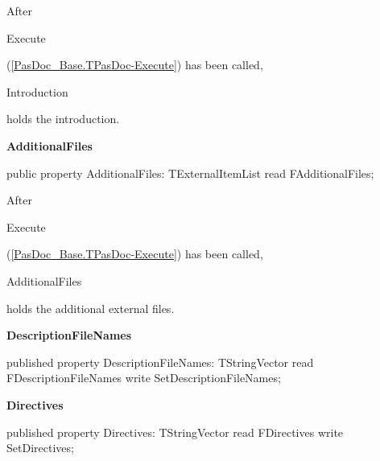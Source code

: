 \documentclass{report}
\newif\ifpdf
\begin{document}
\begin{list}{}
\begin{flushleft}
\ifpdf
\end{flushleft}
\fi


\par After \begin{ttfamily}Execute\end{ttfamily}(\ref{PasDoc_Base.TPasDoc-Execute}) has been called, \begin{ttfamily}Introduction\end{ttfamily} holds the introduction.\label{PasDoc_Base.TPasDoc-AdditionalFiles}
\item[\textbf{AdditionalFiles}\hfill]
\ifpdf
\begin{flushleft}
\fi
\begin{ttfamily}
public property AdditionalFiles: TExternalItemList read FAdditionalFiles;\end{ttfamily}

\ifpdf
\end{flushleft}
\fi


\par After \begin{ttfamily}Execute\end{ttfamily}(\ref{PasDoc_Base.TPasDoc-Execute}) has been called, \begin{ttfamily}AdditionalFiles\end{ttfamily} holds the additional external files.\label{PasDoc_Base.TPasDoc-DescriptionFileNames}
\item[\textbf{DescriptionFileNames}\hfill]
\ifpdf
\begin{flushleft}
\fi
\begin{ttfamily}
published property DescriptionFileNames: TStringVector
      read FDescriptionFileNames write SetDescriptionFileNames;\end{ttfamily}

\ifpdf
\end{flushleft}
\fi


\par  \label{PasDoc_Base.TPasDoc-Directives}
\item[\textbf{Directives}\hfill]
\ifpdf
\begin{flushleft}
\fi
\begin{ttfamily}
published property Directives: TStringVector read FDirectives write SetDirectives;\end{ttfamily}

\ifpdf
\end{flushleft}
\fi



\end{list}
\end{document}

